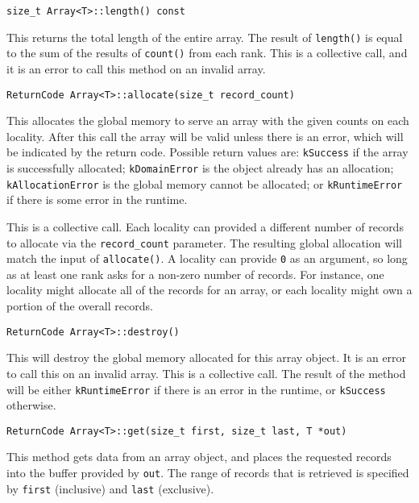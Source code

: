 \begin{lstlisting}
size_t Array<T>::length() const
\end{lstlisting}

\noindent This returns the total length of the entire array. The result of
\texttt{length()} is equal to the sum of the results of \texttt{count()} from
each rank. This is a collective call, and it is an error to call this method
on an invalid array.

\begin{lstlisting}
ReturnCode Array<T>::allocate(size_t record_count)
\end{lstlisting}

\noindent This allocates the global memory to serve an array with the given
counts on
each locality. After this call the array will be valid unless there is an
error, which will be indicated by the return code. Possible return values are:
\texttt{kSuccess} if the array is successfully allocated; \texttt{kDomainError}
is the object already has an allocation; \texttt{kAllocationError} is the
global memory cannot be allocated; or \texttt{kRuntimeError} if there is some
error in the runtime.

This is a collective call. Each locality can provided a different number of
records to allocate via the \texttt{record\_count} parameter. The resulting
global allocation will match the input of \texttt{allocate()}. A locality can
provide \texttt{0} as an argument, so long as at least one rank asks for a
non-zero number of records. For instance, one locality might allocate all of
the records for an array, or each locality might own a portion of the overall
records.

\begin{lstlisting}
ReturnCode Array<T>::destroy()
\end{lstlisting}

\noindent This will destroy the global memory allocated for this array object.
It is
an error to call this on an invalid array. This is a collective call. The
result of the method will be either \texttt{kRuntimeError} if there is an error
in the runtime, or \texttt{kSuccess} otherwise.

\begin{lstlisting}
ReturnCode Array<T>::get(size_t first, size_t last, T *out)
\end{lstlisting}

\noindent This method gets data from an array object, and places the requested
records into the buffer provided by \texttt{out}. The range of records that is
retrieved is specified by \texttt{first} (inclusive) and \texttt{last}
(exclusive).

